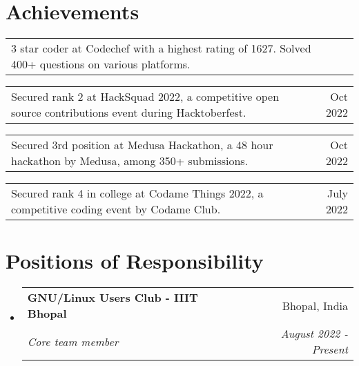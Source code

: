 \documentclass[a4paper,20pt]{article}
\makeatletter
\newcommand{\resumeSubheading}[4]{
  \vspace{-1pt}\item
    \begin{tabular*}{0.97\textwidth}{l@{\extracolsep{\fill}}r}
      \textbf{#1} & #2 \\
      \textit{#3} & \textit{#4} \\
    \end{tabular*}\vspace{-5pt}
}
\newcommand{\resumeSmallSubheading}[2]{
  \vspace{-1pt}\item
    \begin{tabular*}{0.97\textwidth}{l@{\extracolsep{\fill}}r}
      #1 & #2 \\
    \end{tabular*}\vspace{-8pt}
}
\newcommand{\resumeSubHeadingListStart}{\begin{itemize}[leftmargin=*]}
\newcommand{\resumeSubHeadingListEnd}{\end{itemize}}
\makeatother
\begin{document}
\vspace{-2pt}
\section{Achievements}
\begin{description}[font=$\bullet$]
  \resumeSmallSubheading{3 star coder at Codechef with a highest rating of 1627. Solved 400+ questions on various platforms.}{}
  \vspace{-10pt}
  \resumeSmallSubheading{Secured rank 2 at HackSquad 2022, a competitive open source contributions event during Hacktoberfest.} {Oct 2022}
  \vspace{-10pt}
  \resumeSmallSubheading{Secured 3rd position at Medusa Hackathon, a 48 hour hackathon by Medusa, among 350+ submissions.}{Oct 2022}
  \vspace{-10pt}
  \resumeSmallSubheading{Secured rank 4 in college at Codame Things 2022, a competitive coding event by Codame Club.}{July 2022}
\end{description}

\vspace{-2pt}
\section{Positions of Responsibility}
\resumeSubHeadingListStart
    \resumeSubheading
    {GNU/Linux Users Club - IIIT Bhopal}{Bhopal, India}
    {Core team member}{August 2022 - Present}

\resumeSubHeadingListEnd

\vspace{-5pt}
\end{document}
